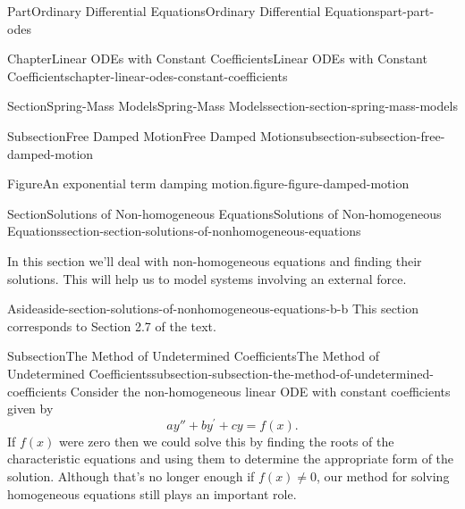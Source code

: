 \documentclass[twoside,10pt,]{book}
\numberwithin{equation}{part}
\begin{document}
\begin{partptx}{Part}{Ordinary Differential Equations}{}{Ordinary Differential Equations}{}{}{part-part-odes}
\begin{chapterptx}{Chapter}{Linear ODEs with Constant Coefficients}{}{Linear ODEs with Constant Coefficients}{}{}{chapter-linear-odes-constant-coefficients}
\begin{sectionptx}{Section}{Spring-Mass Models}{}{Spring-Mass Models}{}{}{section-section-spring-mass-models}
\begin{subsectionptx}{Subsection}{Free Damped Motion}{}{Free Damped Motion}{}{}{subsection-subsection-free-damped-motion}
\begin{figureptx}{Figure}{An exponential term damping motion.}{figure-figure-damped-motion}{}
\begin{image}{0.25}{0.5}{0.25}{}
{
}%
\end{image}%
\tcblower
\end{figureptx}%
\end{subsectionptx}
\end{sectionptx}
%
%
\typeout{************************************************}
\typeout{************************************************}
%
\begin{sectionptx}{Section}{Solutions of Non-homogeneous Equations}{}{Solutions of Non-homogeneous Equations}{}{}{section-section-solutions-of-nonhomogeneous-equations}
\begin{introduction}{}%
In this section we'll deal with non-homogeneous equations and finding their solutions. This will help us to model systems involving an external force.%
\begin{aside}{Aside}{}{aside-section-solutions-of-nonhomogeneous-equations-b-b}%
This section corresponds to Section 2.7 of the text.%
\end{aside}
\end{introduction}%
%
%
\typeout{************************************************}
\typeout{************************************************}
%
\begin{subsectionptx}{Subsection}{The Method of Undetermined Coefficients}{}{The Method of Undetermined Coefficients}{}{}{subsection-subsection-the-method-of-undetermined-coefficients}
Consider the non-homogeneous linear ODE with constant coefficients given by%
\begin{equation}
ay'' + by^\prime + cy = f(x).\label{men-equation-non-homogeneous}
\end{equation}
If \(f(x)\) were zero then we could solve this by finding the roots of the characteristic equations and using them to determine the appropriate form of the solution. Although that's no longer enough if \(f(x)\neq0\), our method for solving homogeneous equations still plays an important role.%

\end{subsectionptx}
\end{sectionptx}
\end{chapterptx}
\end{partptx}
\end{document}
